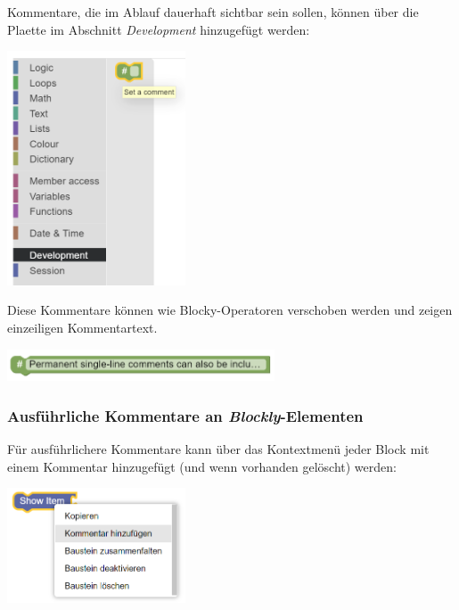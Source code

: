 \documentclass[
  letterpaper,
  DIV=11]{scrreprt}
\begin{document}
\begin{tcolorbox}
Kommentare, die im Ablauf dauerhaft sichtbar sein sollen, können über
die Plaette im Abschnitt \emph{Development} hinzugefügt werden:

\includegraphics[width=2.08333in,height=\textheight]{img/screenshot-routing-palette-comment-example-ENG.png}

Diese Kommentare können wie Blocky-Operatoren verschoben werden und
zeigen einzeiligen Kommentartext.

\includegraphics[width=3.125in,height=\textheight]{img/screenshot-routing-block-comment-example-ENG.png}

\hypertarget{ausfuxfchrliche-kommentare-an-blockly-elementen-1}{%
\subsubsection{\texorpdfstring{Ausführliche Kommentare an
\emph{Blockly}-Elementen}{Ausführliche Kommentare an Blockly-Elementen}}\label{ausfuxfchrliche-kommentare-an-blockly-elementen-1}}

Für ausführlichere Kommentare kann über das Kontextmenü jeder Block mit
einem Kommentar hinzugefügt (und wenn vorhanden gelöscht) werden:

\includegraphics[width=2.08333in,height=\textheight]{img/screenshot-routing-context-menu-comment-example-DEU.png}


\end{tcolorbox}
\end{document}
